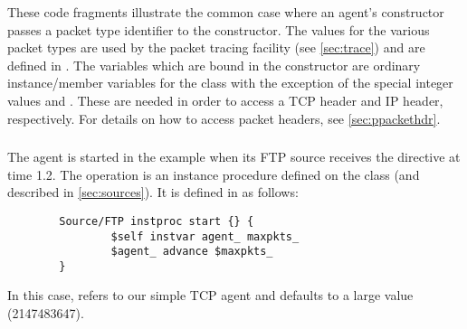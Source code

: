 These code fragments illustrate the common case where an agent's
constructor passes a packet type identifier to the 
constructor.
The values for the various packet types are used by the packet tracing
facility (see \ref{sec:trace}) and are defined in .
The variables which are bound in the  constructor
are ordinary instance/member variables for the class
with the exception of the special integer values 
and .
These are needed in order to access a TCP header and IP header,
respectively.
For details on how to access packet headers, see \ref{sec:ppackethdr}.

\subsubsection{}

The  agent is started in the example when its
FTP source receives the  directive at time 1.2.
The  operation is an instance procedure defined on the
 class (and described in \ref{sec:sources}).
It is defined in  as follows:
\begin{small}
\begin{verbatim}
        Source/FTP instproc start {} {
                $self instvar agent_ maxpkts_
                $agent_ advance $maxpkts_
        }
\end{verbatim}
\end{small}
In this case,  refers to our simple TCP agent and
 defaults to a large value (2147483647).

